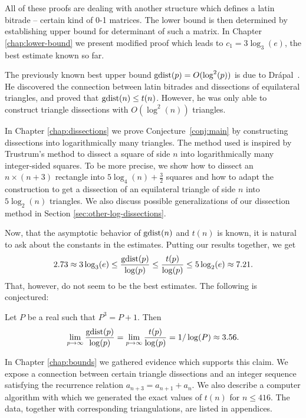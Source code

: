 All of these proofs are dealing with another structure which defines a latin bitrade -- certain kind of 0-1 matrices. The lower bound is then determined by establishing upper bound for determinant of such a matrix. In Chapter \ref{chap:lower-bound} we present modified proof which leads to $c_1 = 3 \log_3(e)$, the best estimate known so far.

\bigskip

The previously known best upper bound $\mathop{\mathrm{gdist}}(p) = O(\log^2(p))$ is due to Drápal~\cite{Drapal91}. He discovered the connection between latin bitrades and dissections of equilateral triangles, and proved that $\mathop{\mathrm{gdist}}(n) \leq t(n)$. However, he was only able to construct triangle dissections with $O(\log^2(n))$ triangles.

In Chapter \ref{chap:dissections} we prove Conjecture~\ref{conj:main} by constructing dissections into logarithmically many triangles. The method used is inspired by Trustrum's method \cite{Trustrum65} to  dissect a square of side $n$ into logarithmically many integer-sided squares. To be more precise, we show how to dissect an $n \times (n+3)$ rectangle into $5 \log_4(n) + \frac{3}{2}$ squares and how to adapt the construction to get a dissection of an equilateral triangle of side $n$ into $5 \log_2(n)$ triangles. We also discuss possible generalizations of our dissection method in Section \ref{sec:other-log-dissections}.

\bigskip

Now, that the asymptotic behavior of $\mathop{\mathrm{gdist}}(n)$ and $t(n)$ is known, it is natural to ask about the constants in the estimates. Putting our results together, we get
\begin{eqnarray}
	2.73 \approx 3 \log_3(e) \leq \frac{\mathop{\mathrm{gdist}}(p)}{\log(p)} \leq \frac{t(p)}{\log(p)} \leq 5 \log_2(e) \approx 7.21.
\end{eqnarray}
That, however, do not seem to be the best estimates. The following is conjectured:

\begin{conj-intro}
Let $P$ be a real such that $P^3 = P+1$. Then
\begin{eqnarray}
	\lim_{p \rightarrow \infty} \frac{\mathop{\mathrm{gdist}}(p)}{\log(p)} =
	\lim_{p \rightarrow \infty} \frac{t(p)}{\log(p)} = 1/\log(P) \approx 3.56.
\end{eqnarray}
\end{conj-intro}

In Chapter \ref{chap:bounds} we gathered evidence which supports this claim. We expose a connection between certain triangle dissections and an integer sequence satisfying the recurrence relation $a_{n+3} = a_{n+1} + a_n$. We also describe a computer algorithm with which we generated the exact values of $t(n)$ for $n \leq 416$. The data, together with corresponding triangulations, are listed in appendices.






